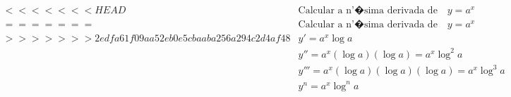 \begin{ex}
\begin{align}
<<<<<<< HEAD
&\text{Calcular a n'�sima derivada de}\quad y=a^{x}\nonumber\\
=======
&\text{Calcular a n'�sima derivada de}\quad y=a^{x}\nonumber\\
>>>>>>> 2edfa61f09aa52eb0e5cbaaba256a294c2d4af48
&y'=a^{x}\log{a}\nonumber\\
&y''=a^{x}(\log{a})(\log{a})=a^{x}\log^2{a}\nonumber\\
&y'''=a^{x}(\log{a})(\log{a})(\log{a})=a^{x}\log^3{a}\nonumber\\
&y^{n}=a^{x}\log^{n}{a}\nonumber
\end{align}
\end{ex}